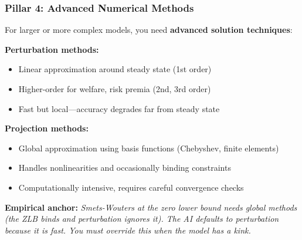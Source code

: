 \documentclass[10pt,english,aspectratio=169]{beamer}
\begin{document}
\begin{frame}
\frametitle{Pillar 4: Advanced Numerical Methods}

For larger or more complex models, you need \textbf{advanced solution techniques}:

\vspace{0.2cm}

\textbf{Perturbation methods:}
\begin{itemize}
    \item Linear approximation around steady state (1st order)
    \item Higher-order for welfare, risk premia (2nd, 3rd order)
    \item Fast but local---accuracy degrades far from steady state
\end{itemize}

\textbf{Projection methods:}
\begin{itemize}
    \item Global approximation using basis functions (Chebyshev, finite elements)
    \item Handles nonlinearities and occasionally binding constraints
    \item Computationally intensive, requires careful convergence checks
\end{itemize}

\vspace{0.3cm}

\textbf{Empirical anchor:} \textit{Smets-Wouters at the zero lower bound needs global methods (the ZLB binds and perturbation ignores it). The AI defaults to perturbation because it is fast. You must override this when the model has a kink.}
\end{frame}
\end{document}
